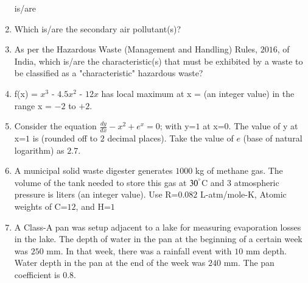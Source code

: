 \documentclass[journal]{IEEEtran}
\numberwithin{equation}{enumi}
\numberwithin{figure}{enumi}
\begin{document}
\begin{enumerate}[start=1, label={Q\arabic*.}]
is/are
\begin{enumerate} 
  \end{enumerate}
\item Which is/are the secondary air pollutant(s)?
 \begin{enumerate} 
  \end{enumerate}
  \newpage
\item As per the Hazardous Waste (Management and Handling) Rules, $2016$, of India, which
is/are the characteristic(s) that must be exhibited by a waste to be classified as a
"characteristic" hazardous waste?
 \begin{enumerate} 
\end{enumerate}
\item f(x) = $x^3$ - $4.5x^2$ - $12x$ has local maximum at x = \underline{\hspace{1.5cm}}(an integer value) in the range x = $-2$ to $+2$.
\vspace{0.1cm}
\item Consider the equation $\frac{dy}{dx}- x^{2} + e^{x} = 0$; with y=$1$ at x=$0$. The value of y at x=$1$ is \underline{\hspace{1.5cm}}(rounded off to $2$ decimal places). Take the value of $e$ (base of natural logarithm) as $2.7$.
\vspace{0.1cm}
\item A municipal solid waste digester generates $1000$ kg of methane gas. The volume of
the tank needed to store this gas at $30^{\degree}$C and $3$ atmospheric pressure is \underline{\hspace{1.5cm}} liters
(an integer value).
Use R=$0.082$ L-atm/mole-K, Atomic weights of C=$12$, and H=$1$
\vspace{0.1cm}
\item A Class-A pan was setup adjacent to a lake for measuring evaporation losses in the lake.
The depth of water in the pan at the beginning of a certain week was $250$ mm. In that week,
there was a rainfall event with $10$ mm depth. Water depth in the pan at the end of the week
was $240$ mm. The pan coefficient is $0.8$.


\end{enumerate}
\end{document}
